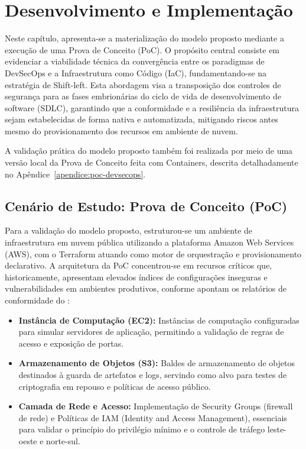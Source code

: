 \chapter{Desenvolvimento e Implementação}
Neste capítulo, apresenta-se a materialização do modelo proposto mediante a execução de uma Prova de Conceito (PoC). O propósito central consiste em evidenciar a viabilidade técnica da convergência entre os paradigmas de DevSecOps e a Infraestrutura como Código (IaC), fundamentando-se na estratégia de Shift-left. Esta abordagem visa a transposição dos controles de segurança para as fases embrionárias do ciclo de vida de desenvolvimento de software (SDLC), garantindo que a conformidade e a resiliência da infraestrutura sejam estabelecidas de forma nativa e automatizada, mitigando riscos antes mesmo do provisionamento dos recursos em ambiente de nuvem.

A validação prática do modelo proposto também foi realizada por meio de uma versão local da Prova de Conceito feita com Containers, descrita detalhadamente no Apêndice~\ref{apendice:poc-devsecops}.

\section{Cenário de Estudo: Prova de Conceito (PoC)}
Para a validação do modelo proposto, estruturou-se um ambiente de infraestrutura em nuvem pública utilizando a plataforma Amazon Web Services (AWS), com o Terraform atuando como motor de orquestração e provisionamento declarativo. A arquitetura da PoC concentrou-se em recursos críticos que, historicamente, apresentam elevados índices de configurações inseguras e vulnerabilidades em ambientes produtivos, conforme apontam os relatórios de conformidade do :
\begin{itemize}
    \item\textbf{Instância de Computação (EC2):} Instâncias de computação configuradas para simular servidores de aplicação, permitindo a validação de regras de acesso e exposição de portas.
    \item\textbf{Armazenamento de Objetos (S3):} Baldes de armazenamento de objetos destinados à guarda de artefatos e logs, servindo como alvo para testes de criptografia em repouso e políticas de acesso público.
    \item\textbf{Camada de Rede e Acesso:} Implementação de Security Groups (firewall de rede) e Políticas de IAM (Identity and Access Management), essenciais para validar o princípio do privilégio mínimo e o controle de tráfego leste-oeste e norte-sul.
\end{itemize}

